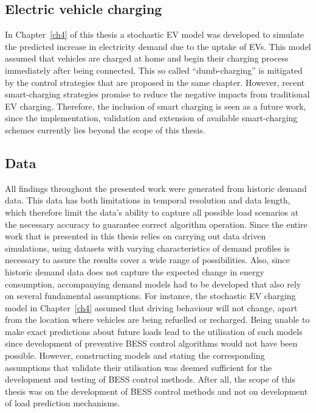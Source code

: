 \subsection{Electric vehicle charging}

In Chapter~\ref{ch4} of this thesis a stochastic EV model was developed to simulate the predicted increase in electricity demand due to the uptake of EVs.
This model assumed that vehicles are charged at home and begin their charging process immediately after being connected.
This so called ``dumb-charging'' is mitigated by the control strategies that are proposed in the same chapter.
However, recent smart-charging strategies promise to reduce the negative impacts from traditional EV charging.
Therefore, the inclusion of smart charging is seen as a future work, since the implementation, validation and extension of available smart-charging schemes currently lies beyond the scope of this thesis.

\subsection{Data}

All findings throughout the presented work were generated from historic demand data.
This data has both limitations in temporal resolution and data length, which therefore limit the data's ability to capture all possible load scenarios at the necessary accuracy to guarantee correct algorithm operation.
Since the entire work that is presented in this thesis relies on carrying out data driven simulations, using datasets with varying characteristics of demand profiles is necessary to assure the results cover a wide range of possibilities.
Also, since historic demand data does not capture the expected change in energy consumption, accompanying demand models had to be developed that also rely on several fundamental assumptions.
For instance, the stochastic EV charging model in Chapter~\ref{ch4} assumed that driving behaviour will not change, apart from the location where vehicles are being refuelled or recharged.
Being unable to make exact predictions about future loads lead to the utilisation of such models since development of preventive BESS control algorithms would not have been possible.
However, constructing models and stating the corresponding assumptions that validate their utilisation was deemed sufficient for the development and testing of BESS control methods.
After all, the scope of this thesis was on the development of BESS control methods and not on development of load prediction mechanisms.

